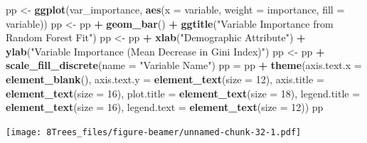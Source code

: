\documentclass[10pt,ignorenonframetext,]{beamer}
\newenvironment{Shaded}{\begin{snugshade}}{\end{snugshade}}
\newcommand{\KeywordTok}[1]{\textcolor[rgb]{0.13,0.29,0.53}{\textbf{#1}}}
\newcommand{\DataTypeTok}[1]{\textcolor[rgb]{0.13,0.29,0.53}{#1}}
\newcommand{\DecValTok}[1]{\textcolor[rgb]{0.00,0.00,0.81}{#1}}
\newcommand{\StringTok}[1]{\textcolor[rgb]{0.31,0.60,0.02}{#1}}
\newcommand{\OperatorTok}[1]{\textcolor[rgb]{0.81,0.36,0.00}{\textbf{#1}}}
\newcommand{\NormalTok}[1]{#1}
\begin{document}
\begin{frame}[fragile]
\begin{Shaded}
\begin{Highlighting}[]
\NormalTok{pp <-}\StringTok{ }\KeywordTok{ggplot}\NormalTok{(var_importance, }\KeywordTok{aes}\NormalTok{(}\DataTypeTok{x =}\NormalTok{ variable, }\DataTypeTok{weight =}\NormalTok{ importance, }
    \DataTypeTok{fill =}\NormalTok{ variable))}
\NormalTok{pp <-}\StringTok{ }\NormalTok{pp }\OperatorTok{+}\StringTok{ }\KeywordTok{geom_bar}\NormalTok{() }\OperatorTok{+}\StringTok{ }\KeywordTok{ggtitle}\NormalTok{(}\StringTok{"Variable Importance from Random Forest Fit"}\NormalTok{)}
\NormalTok{pp <-}\StringTok{ }\NormalTok{pp }\OperatorTok{+}\StringTok{ }\KeywordTok{xlab}\NormalTok{(}\StringTok{"Demographic Attribute"}\NormalTok{) }\OperatorTok{+}\StringTok{ }\KeywordTok{ylab}\NormalTok{(}\StringTok{"Variable Importance (Mean Decrease in Gini Index)"}\NormalTok{)}
\NormalTok{pp <-}\StringTok{ }\NormalTok{pp }\OperatorTok{+}\StringTok{ }\KeywordTok{scale_fill_discrete}\NormalTok{(}\DataTypeTok{name =} \StringTok{"Variable Name"}\NormalTok{)}
\NormalTok{pp =}\StringTok{ }\NormalTok{pp }\OperatorTok{+}\StringTok{ }\KeywordTok{theme}\NormalTok{(}\DataTypeTok{axis.text.x =} \KeywordTok{element_blank}\NormalTok{(), }\DataTypeTok{axis.text.y =} \KeywordTok{element_text}\NormalTok{(}\DataTypeTok{size =} \DecValTok{12}\NormalTok{), }
    \DataTypeTok{axis.title =} \KeywordTok{element_text}\NormalTok{(}\DataTypeTok{size =} \DecValTok{16}\NormalTok{), }\DataTypeTok{plot.title =} \KeywordTok{element_text}\NormalTok{(}\DataTypeTok{size =} \DecValTok{18}\NormalTok{), }
    \DataTypeTok{legend.title =} \KeywordTok{element_text}\NormalTok{(}\DataTypeTok{size =} \DecValTok{16}\NormalTok{), }\DataTypeTok{legend.text =} \KeywordTok{element_text}\NormalTok{(}\DataTypeTok{size =} \DecValTok{12}\NormalTok{))}
\NormalTok{pp}
\end{Highlighting}
\end{Shaded}

\texttt{[image: 8Trees\_files/figure-beamer/unnamed-chunk-32-1.pdf]}

\end{frame}
\end{document}
